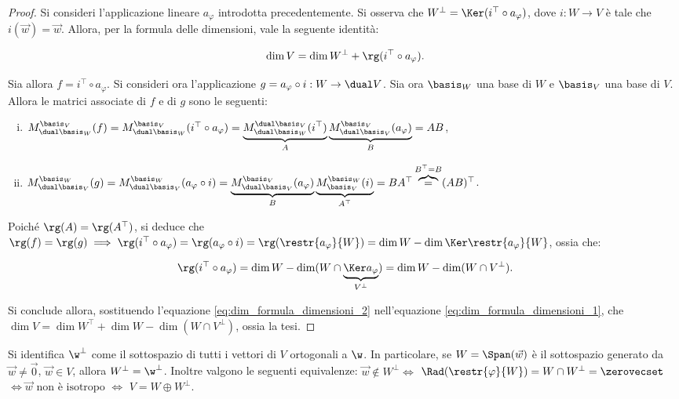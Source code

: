 \documentclass[11pt]{article}
\begin{document}
	\begin{proof}
		Si consideri l'applicazione lineare $a_\varphi$ introdotta precedentemente. Si osserva che $W^\perp = \Ker (i^\top \circ a_\varphi)$, dove $i : W \to V$ è tale che $i(\vec w) = \vec w$. Allora,
		per la formula delle dimensioni, vale la seguente identità: 
		
		\begin{equation}
			\label{eq:dim_formula_dimensioni_1}
			\dim V = \dim W^\perp + \rg (i^\top \circ a_\varphi). 
		\end{equation}
		
		\vskip 0.05in
		
		Sia allora $f = i^\top \circ a_\varphi$.
		Si consideri ora l'applicazione $g = a_\varphi \circ i : W \to \dual V$. Sia ora $\basis_W$ una base di $W$ e
		$\basis_V$ una base di $V$. Allora le matrici associate di $f$ e di $g$ sono le seguenti:
		
		\begin{enumerate}[(i)]
			\item $M_{\dual \basis_W}^{\basis_V}(f) = M_{\dual \basis_W}^{\basis_V}(i^\top \circ a_\varphi) =
			\underbrace{M_{\dual \basis_W}^{\dual \basis_V}(i^\top)}_A \underbrace{M_{\dual \basis_V}^{\basis_V}(a_\varphi)}_B = AB$,
			\item $M_{\dual \basis_V}^{\basis_W}(g) = M_{\dual \basis_V}^{\basis_W}(a_\varphi \circ i) =
			\underbrace{M_{\dual \basis_V}^{\basis_V}(a_\varphi)}_B \underbrace{M_{\basis_V}^{\basis_W}(i)}_{A^\top} = BA^\top \overbrace{=}^{B^\top = B} (AB)^\top$.
		\end{enumerate}
	
		Poiché $\rg(A) = \rg(A^\top)$, si deduce che $\rg(f) = \rg(g) \implies \rg(i^\top \circ a_\varphi) = \rg(a_\varphi \circ i) = \rg(\restr{a_\varphi}{W}) = \dim W - \dim \Ker \restr{a_\varphi}{W}$, ossia che:
		
		\begin{equation}
			\label{eq:dim_formula_dimensioni_2}
			\rg(i^\top \circ a_\varphi) = \dim W - \dim (W \cap \underbrace{\Ker a_\varphi}_{V^\perp}) = \dim W - \dim (W \cap V^\perp).
		\end{equation}
		
		Si conclude allora, sostituendo l'equazione \eqref{eq:dim_formula_dimensioni_2} nell'equazione \eqref{eq:dim_formula_dimensioni_1}, che $\dim V = \dim W^\top + \dim W - \dim (W \cap V^\perp)$, ossia la tesi.
	\end{proof}

	\begin{remark} Si identifica $\w^\perp$ come il sottospazio di tutti i vettori di $V$ ortogonali a $\w$.
		In particolare, se $W = \Span(\vec w)$ è il sottospazio generato da $\vec w \neq \vec 0$, $\vec w \in V$, allora $W^\perp = \w^\perp$. Inoltre valgono le seguenti equivalenze: $\vec w \notin W^\perp \iff$ $\Rad (\restr{\varphi}{W}) = W \cap W^\perp = \zerovecset$ $\iff \vec w \text{ non è isotropo } \iff$ $V = W \oplus W^\perp$.
	\end{remark}
\end{document}
